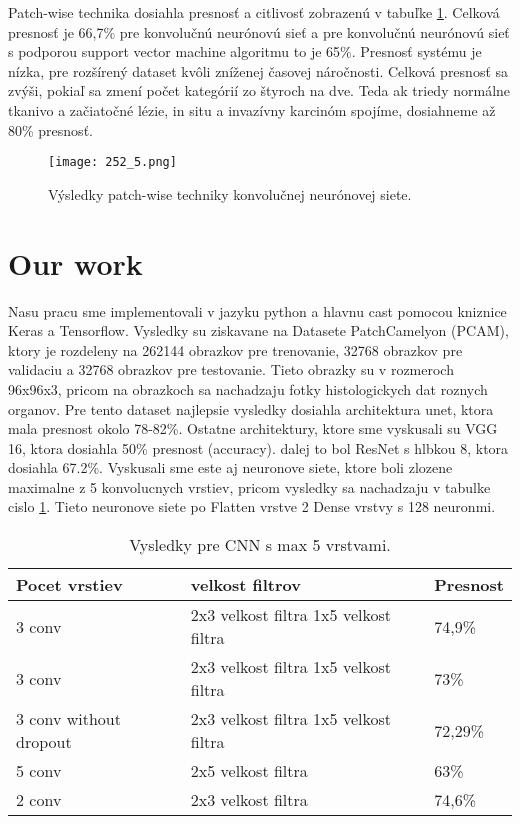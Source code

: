 \documentclass[runningheads]{llncs}
\begin{document}
Patch-wise technika dosiahla presnosť a citlivosť zobrazenú v tabuľke \ref{fig:vysledkyPatch-Wise}. Celková presnosť je 66,7\% pre konvolučnú neurónovú sieť a pre konvolučnú neurónovú sieť s podporou support vector machine algoritmu to je 65\%. Presnosť systému je nízka, pre rozšírený dataset kvôli zníženej časovej náročnosti. Celková presnosť sa zvýši, pokiaľ sa zmení počet kategórií zo štyroch na dve. Teda ak triedy normálne tkanivo a začiatočné lézie, in situ a invazívny karcinóm spojíme,  dosiahneme až 80\% presnosť. \cite{ClassificationBreastCancer}

\begin{figure}[h!]
\begin{centering}
\texttt{[image: 252\_5.png]}
\par\end{centering}
\caption{Výsledky patch-wise techniky konvolučnej neurónovej siete. \label{fig:vysledkyPatch-Wise}\cite{ClassificationBreastCancer}}
\end{figure}

\section{Our work}

Nasu pracu sme implementovali v jazyku python a hlavnu cast pomocou kniznice Keras a Tensorflow.
Vysledky su ziskavane na Datasete PatchCamelyon (PCAM), ktory je rozdeleny na 262144 obrazkov pre trenovanie, 32768 obrazkov pre validaciu a 32768 obrazkov pre testovanie. 
Tieto obrazky su v rozmeroch 96x96x3, pricom na obrazkoch sa nachadzaju fotky histologickych dat roznych organov.\cite{pcam} 
Pre tento dataset najlepsie vysledky dosiahla architektura unet, ktora mala presnost okolo 78-82\%. 
Ostatne architektury, ktore sme vyskusali su VGG 16, ktora dosiahla 50\% presnost (accuracy). dalej to bol ResNet s hlbkou 8, ktora dosiahla 67.2\%. 
Vyskusali sme este aj neuronove siete, ktore boli zlozene maximalne z 5 konvolucnych vrstiev, pricom vysledky sa nachadzaju v tabulke cislo  \ref{tab2}. 
Tieto neuronove siete po Flatten vrstve 2 Dense vrstvy s 128 neuronmi. 

\begin{table}
\caption{Vysledky pre CNN s max 5 vrstvami.}\label{tab2}
\begin{tabular}{|l|l|l|}
\hline
Pocet vrstiev & velkost filtrov & Presnost \\
\hline
3 conv & 2x3 velkost filtra 1x5 velkost filtra & 74,9\% \\
3 conv & 2x3 velkost filtra 1x5 velkost filtra & 73\% \\
3 conv without dropout & 2x3 velkost filtra 1x5 velkost filtra & 72,29\% \\
5 conv & 2x5 velkost filtra & 63\% \\
2 conv & 2x3 velkost filtra & 74,6\% \\
\hline
\end{tabular}
\end{table}
\end{document}
